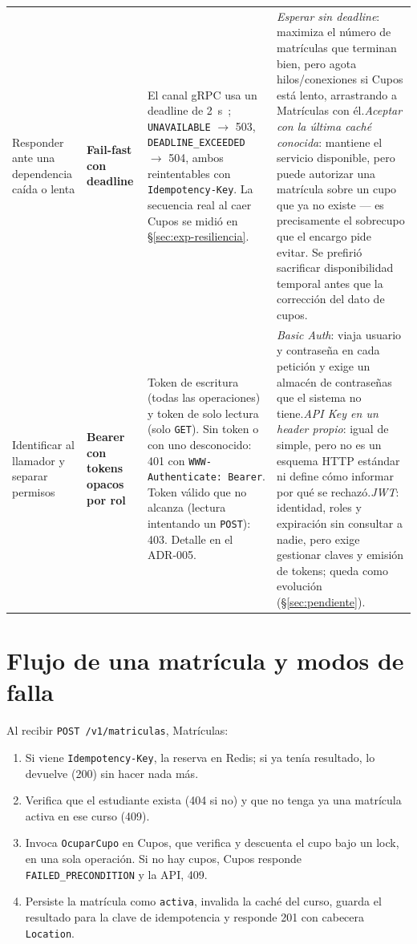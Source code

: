 \documentclass[11pt,spanish]{article}
\begin{document}
\begin{xltabular}{\textwidth}{p{2.4cm} p{2.4cm} X X}
\addlinespace
Responder ante una dependencia caída o lenta & \textbf{Fail-fast con deadline} & El canal gRPC usa un deadline de 2~s~\cite{grpcdeadlines}; \texttt{UNAVAILABLE} $\to$ 503, \texttt{DEADLINE\_EXCEEDED} $\to$ 504, ambos reintentables con \texttt{Idempotency-Key}. La secuencia real al caer Cupos se midió en \S\ref{sec:exp-resiliencia}. & \textit{Esperar sin deadline}: maximiza el número de matrículas que terminan bien, pero agota hilos/conexiones si Cupos está lento, arrastrando a Matrículas con él.\newline \textit{Aceptar con la última caché conocida}: mantiene el servicio disponible, pero puede autorizar una matrícula sobre un cupo que ya no existe — es precisamente el sobrecupo que el encargo pide evitar. Se prefirió sacrificar disponibilidad temporal antes que la corrección del dato de cupos. \\
\addlinespace
Identificar al llamador y separar permisos & \textbf{Bearer con tokens opacos por rol}~\cite{rfc6750} & Token de escritura (todas las operaciones) y token de solo lectura (solo \texttt{GET}). Sin token o con uno desconocido: 401 con \texttt{WWW-Authenticate: Bearer}. Token válido que no alcanza (lectura intentando un \texttt{POST}): 403. Detalle en el ADR-005. & \textit{Basic Auth}: viaja usuario y contraseña en cada petición y exige un almacén de contraseñas que el sistema no tiene.\newline \textit{API Key en un header propio}: igual de simple, pero no es un esquema HTTP estándar ni define cómo informar por qué se rechazó.\newline \textit{JWT}: identidad, roles y expiración sin consultar a nadie, pero exige gestionar claves y emisión de tokens; queda como evolución (\S\ref{sec:pendiente}). \\
\end{xltabular}

\section{Flujo de una matrícula y modos de falla}\label{sec:flujo}

Al recibir \texttt{POST /v1/matriculas}, Matrículas:

\begin{enumerate}
    \item Si viene \texttt{Idempotency-Key}, la reserva en Redis; si ya tenía resultado, lo devuelve (200) sin hacer nada más.
    \item Verifica que el estudiante exista (404 si no) y que no tenga ya una matrícula activa en ese curso (409).
    \item Invoca \texttt{OcuparCupo} en Cupos, que verifica y descuenta el cupo bajo un lock, en una sola operación. Si no hay cupos, Cupos responde \texttt{FAILED\_PRECONDITION} y la API, 409.
    \item Persiste la matrícula como \texttt{activa}, invalida la caché del curso, guarda el resultado para la clave de idempotencia y responde 201 con cabecera \texttt{Location}.
\end{enumerate}
\end{document}
